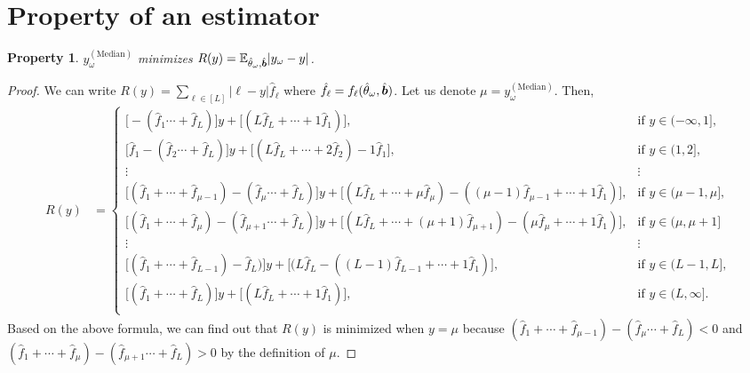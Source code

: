 \documentclass[11pt]{article}
\theoremstyle{plain}
\newtheorem{pro}{Property}
\theoremstyle{definition}
\begin{document}
\section{Property of an estimator}

\begin{pro}
$y^{(\text{Median})}_\omega$ minimizes $R(y) = \mathbb{E}_{\hat{\theta}_\omega,\hat{\bm{b}}}|y_\omega-y|$.
\end{pro}
\begin{proof}
We can write $R(y) = \sum_{\ell\in[L]}|\ell-y|\hat f_\ell$ where $\hat f_\ell = f_\ell(\hat{\theta}_\omega,\hat{\bm{b}})$. Let us denote $\mu = y^{(\text{Median})}_\omega$. Then,
\begin{align*}
  R(y)&=
  \begin{cases}
  \big[- (\hat f_1 \cdots +\hat f_L)\big]y + \big[(L\hat f_L+\cdots +1\hat f_1)\big],& \text{if $y\in(-\infty,1]$},\\
  \big[\hat f_1 - (\hat f_2 \cdots +\hat f_L)\big]y + \big[(L\hat f_L+\cdots +2\hat f_2) -1\hat f_1\big],& \text{if $y\in(1,2]$},\\
  \vdots & \vdots\\
  \big[(\hat f_1 +\cdots + \hat f_{\mu-1}) - (\hat f_{\mu} \cdots +\hat f_L)\big]y + \big[(L\hat f_L+\cdots +\mu\hat f_\mu) -((\mu-1)\hat f_{\mu-1}+\cdots+1\hat f_1)\big],& \text{if $y\in(\mu-1, \mu]$},\\
  \big[(\hat f_1 +\cdots + \hat f_{\mu}) - (\hat f_{\mu+1} \cdots +\hat f_L)\big]y + \big[(L\hat f_L+\cdots +(\mu+1)\hat f_{\mu+1}) -(\mu\hat f_\mu+\cdots+1\hat f_1)\big],& \text{if $y\in(\mu, \mu+1]$} \\
  \vdots  &\vdots\\
  \big[(\hat f_1 +\cdots + \hat f_{L-1}) - \hat f_L)\big]y + \big[(L\hat f_L -((L-1)\hat f_{L-1}+\cdots+1\hat f_1)\big],& \text{if $y\in(L-1, L]$},\\
  \big[(\hat f_1 +\cdots + \hat f_{L})\big]y + \big[(L\hat f_L+\cdots+1\hat f_1)\big],& \text{if $y\in(L, \infty]$}.\\
  \end{cases}
\end{align*}
Based on the above formula, we can find out that $R(y)$ is minimized when $y = \mu$ because $ (\hat f_1 +\cdots + \hat f_{\mu-1}) - (\hat f_{\mu} \cdots +\hat f_L)<0 $ and $ (\hat f_1 +\cdots + \hat f_{\mu}) - (\hat f_{\mu+1} \cdots +\hat f_L)>0$ by the definition of $\mu$.
\end{proof}
\end{document}
